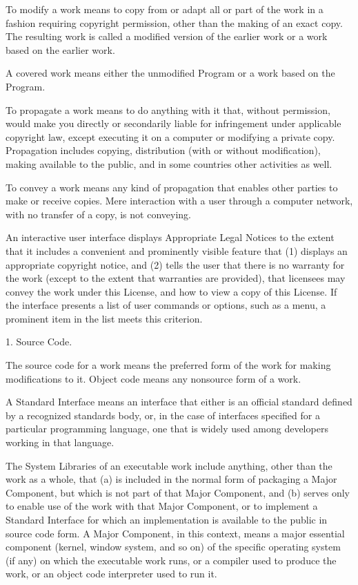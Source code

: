 \documentclass[letterpaper,10pt,english]{sphinxmanual}
\begin{document}
\begin{sphinxVerbatim}[commandchars=\\\{\}]
  To \PYGZdq{}modify\PYGZdq{} a work means to copy from or adapt all or part of the work
in a fashion requiring copyright permission, other than the making of an
exact copy.  The resulting work is called a \PYGZdq{}modified version\PYGZdq{} of the
earlier work or a work \PYGZdq{}based on\PYGZdq{} the earlier work.

  A \PYGZdq{}covered work\PYGZdq{} means either the unmodified Program or a work based
on the Program.

  To \PYGZdq{}propagate\PYGZdq{} a work means to do anything with it that, without
permission, would make you directly or secondarily liable for
infringement under applicable copyright law, except executing it on a
computer or modifying a private copy.  Propagation includes copying,
distribution (with or without modification), making available to the
public, and in some countries other activities as well.

  To \PYGZdq{}convey\PYGZdq{} a work means any kind of propagation that enables other
parties to make or receive copies.  Mere interaction with a user through
a computer network, with no transfer of a copy, is not conveying.

  An interactive user interface displays \PYGZdq{}Appropriate Legal Notices\PYGZdq{}
to the extent that it includes a convenient and prominently visible
feature that (1) displays an appropriate copyright notice, and (2)
tells the user that there is no warranty for the work (except to the
extent that warranties are provided), that licensees may convey the
work under this License, and how to view a copy of this License.  If
the interface presents a list of user commands or options, such as a
menu, a prominent item in the list meets this criterion.

  1. Source Code.

  The \PYGZdq{}source code\PYGZdq{} for a work means the preferred form of the work
for making modifications to it.  \PYGZdq{}Object code\PYGZdq{} means any non\PYGZhy{}source
form of a work.

  A \PYGZdq{}Standard Interface\PYGZdq{} means an interface that either is an official
standard defined by a recognized standards body, or, in the case of
interfaces specified for a particular programming language, one that
is widely used among developers working in that language.

  The \PYGZdq{}System Libraries\PYGZdq{} of an executable work include anything, other
than the work as a whole, that (a) is included in the normal form of
packaging a Major Component, but which is not part of that Major
Component, and (b) serves only to enable use of the work with that
Major Component, or to implement a Standard Interface for which an
implementation is available to the public in source code form.  A
\PYGZdq{}Major Component\PYGZdq{}, in this context, means a major essential component
(kernel, window system, and so on) of the specific operating system
(if any) on which the executable work runs, or a compiler used to
produce the work, or an object code interpreter used to run it.


\end{sphinxVerbatim}
\end{document}
